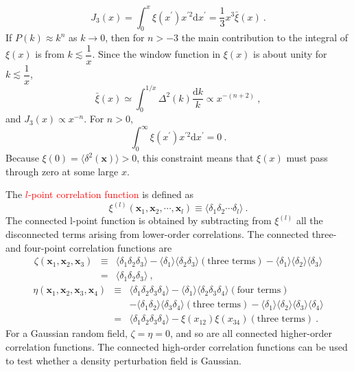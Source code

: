 \documentclass[12pt,a4paper]{article}
\renewcommand{\vec}[1]{\boldsymbol{#1}}
\newcommand{\dif}{\mathrm{d}}
\begin{document}
\begin{equation*}
J_3(x) = \int_0^x \xi(x^\prime) x^{\prime 2} \dif x^\prime = \frac{1}{3} x^3 \bar{\xi}(x) ~.
\end{equation*}
If $P(k) \approx k^n$ as $k \rightarrow 0$, then for $n > -3$ the main contribution to the integral of $\xi(x)$ is from $k \lesssim \dfrac{1}{x}$.
Since the window function in $\xi(x)$ is about unity for $k \lesssim \dfrac{1}{x}$,
\begin{equation}
\bar{\xi}(x) \simeq \int_0^{1/x} \Delta^2(k) \frac{\dif k}{k} \propto x^{-(n+2)} ~,
\end{equation}
and $J_3(x) \propto x^{-n}$. For $n > 0$, 
\begin{equation*}
\int_0^\infty \xi(x^\prime) x^{\prime 2} \dif x^\prime = 0 ~.
\end{equation*}
Because $\xi(0) = \langle \delta^2(\vec{x}) \rangle  > 0$, this constraint means that $\xi(x)$ must pass through zero at some large $x$.

The \textcolor{red}{$l$-point correlation function} is defined as
\begin{equation}
\xi^{(l)}(\vec{x}_1, \vec{x}_2, \cdots, \vec{x}_l) \equiv \langle \delta_1 \delta_2 \cdots \delta_l \rangle ~.
\end{equation}
The connected l-point function is obtained by subtracting from $\xi^{(l)}$ all the disconnected terms arising from lower-order correlations. The connected three- and four-point correlation functions are
\begin{eqnarray*}
\zeta(\vec{x}_1, \vec{x}_2, \vec{x}_3) &\equiv& \langle \delta_1 \delta_2  \delta_3 \rangle -\langle \delta_1 \rangle \langle \delta_2 \delta_3 \rangle (\text{three terms}) -\langle \delta_1 \rangle  \langle \delta_2 \rangle \langle \delta_3 \rangle \\
&=& \langle \delta_1 \delta_2  \delta_3 \rangle ~,
\end{eqnarray*}
\begin{eqnarray*}
\eta(\vec{x}_1, \vec{x}_2, \vec{x}_3, \vec{x}_4) &\equiv& \langle \delta_1 \delta_2  \delta_3 \delta_4 \rangle -\langle \delta_1 \rangle \langle \delta_2 \delta_3 \delta_4\rangle (\text{four terms}) \\
&&-\langle \delta_1 \delta_2\rangle \langle \delta_3 \delta_4\rangle (\text{three terms}) -\langle \delta_1 \rangle  \langle \delta_2 \rangle \langle \delta_3 \rangle \langle \delta_4 \rangle  \\
&=&  \langle \delta_1 \delta_2  \delta_3 \delta_4 \rangle -\xi(x_{12}) \xi(x_{34})(\text{three terms}) ~.
\end{eqnarray*}
For a Gaussian random field, $\zeta = \eta = 0$, and so are all connected higher-order correlation functions. The connected high-order correlation functions can be used to test whether a density perturbation field is Gaussian.
\end{document}
